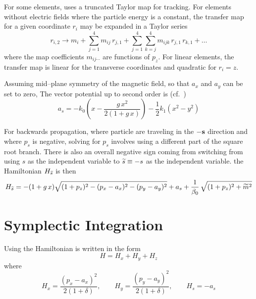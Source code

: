 For some elements,  uses a truncated Taylor map for
tracking.  For elements without electric fields where the particle
energy is a constant, the transfer map for a given coordinate $r_i$
may be expanded in a Taylor series
\begin{equation}
  r_{i,2} \rightarrow m_i + \sum_{j = 1}^4 m_{ij} \, r_{j,1} + 
  \sum_{j = 1}^4 \sum_{k = j}^4 m_{ijk} \, r_{j,1} \, r_{k,1} + \ldots
\end{equation}
where the map coefficients $m_{ij\cdots}$ are functions of $p_z$.  For
linear elements, the transfer map is linear for the transverse
coordinates and quadratic for $r_i = z$.

Assuming mid--plane symmetry of the magnetic field, so
that $a_x$ and $a_y$ can be set to zero\cite{b:madphysics}, The vector
potential up to second order is (cf.~)
\begin{equation}
  a_s = -k_0 \left( x - \frac{g \, x^2}{2 (1 + g\, x)} \right) -
  \frac{1}{2} k_1 \left( x^2 - y^2 \right)
  \label{akxgx}
\end{equation}

For backwards propagation, where particle are traveling in the $-{\bf s}$ direction and where $p_s$ is negative, solving for $p_s$ involves
using a different part of the square root branch. There is also an
overall negative sign coming from switching from using $s$ as the
independent variable to $\widetilde s \equiv -s$ as the independent
variable. the Hamiltonian $H_{\widetilde s}$ is then
\begin{equation}
  H_{\widetilde s} = -(1 + g \, x) \sqrt{(1 + p_z)^2 - (p_x - a_x)^2 - (p_y - a_y)^2} + 
  a_s + \frac{1}{\beta_0} \, \sqrt{(1+p_z)^2 + \widetilde m^2}
\end{equation}

\section{Symplectic Integration}
\label{s:symp.track}

Using  the Hamiltonian is written in the form
\begin{equation}
  H = H_x + H_y + H_z
\end{equation}
where
\begin{equation}
  H_x = \frac{(p_x - a_x)^2}{2 (1 + \delta)}, \qquad
  H_y = \frac{(p_y - a_y)^2}{2 (1 + \delta)}, \qquad
  H_s = - a_s 
\end{equation}

